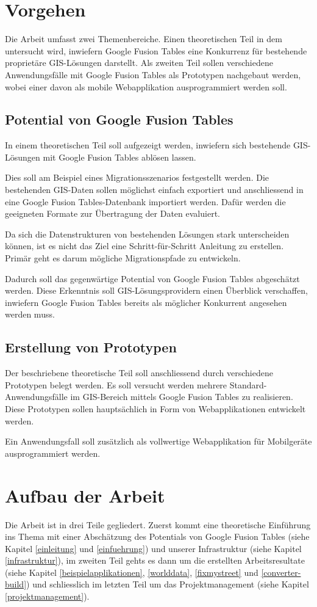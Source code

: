 \section{Vorgehen}
Die Arbeit umfasst zwei Themenbereiche. Einen theoretischen Teil in dem untersucht wird, inwiefern Google Fusion Tables eine Konkurrenz für bestehende proprietäre GIS-Lösungen darstellt. Als zweiten Teil sollen verschiedene Anwendungsfälle mit Google Fusion Tables als Prototypen nachgebaut werden, wobei einer davon als mobile Webapplikation ausprogrammiert werden soll.

\subsection{Potential von Google Fusion Tables}
In einem theoretischen Teil soll aufgezeigt werden, inwiefern sich bestehende GIS-Lösungen mit Google Fusion Tables ablösen lassen.

Dies soll am Beispiel eines Migrationsszenarios festgestellt werden. Die bestehenden GIS-Daten sollen möglichst einfach exportiert und anschliessend in eine Google Fusion Tables-Datenbank importiert werden. Dafür werden die geeigneten Formate zur Übertragung der Daten evaluiert.

Da sich die Datenstrukturen von bestehenden Lösungen stark unterscheiden können, ist es nicht das Ziel eine Schritt-für-Schritt Anleitung zu erstellen. Primär geht es darum mögliche Migrationspfade zu entwickeln.

Dadurch soll das gegenwärtige Potential von Google Fusion Tables abgeschätzt werden. Diese Erkenntnis soll GIS-Lösungsprovidern einen Überblick verschaffen, inwiefern Google Fusion Tables bereits als möglicher Konkurrent angesehen werden muss.

\subsection{Erstellung von Prototypen}
Der beschriebene theoretische Teil soll anschliessend durch verschiedene Prototypen belegt werden. Es soll versucht werden mehrere Standard-Anwendungsfälle im GIS-Bereich mittels Google Fusion Tables zu realisieren. Diese Prototypen sollen hauptsächlich in Form von Webapplikationen entwickelt werden.

Ein Anwendungsfall soll zusätzlich als vollwertige Webapplikation für Mobilgeräte ausprogrammiert werden.

\section{Aufbau der Arbeit}
Die Arbeit ist in drei Teile gegliedert. Zuerst kommt eine theoretische Einführung ins Thema mit einer Abschätzung des Potentials von Google Fusion Tables (siehe Kapitel \ref{einleitung} und \ref{einfuehrung}) und unserer Infrastruktur (siehe Kapitel \ref{infrastruktur}), im zweiten Teil gehts es dann um die erstellten Arbeitsresultate (siehe Kapitel \ref{beispielapplikationen}, \ref{worlddata}, \ref{fixmystreet} und \ref{converter-build}) und schliesslich im letzten Teil um das Projektmanagement (siehe Kapitel \ref{projektmanagement}).

